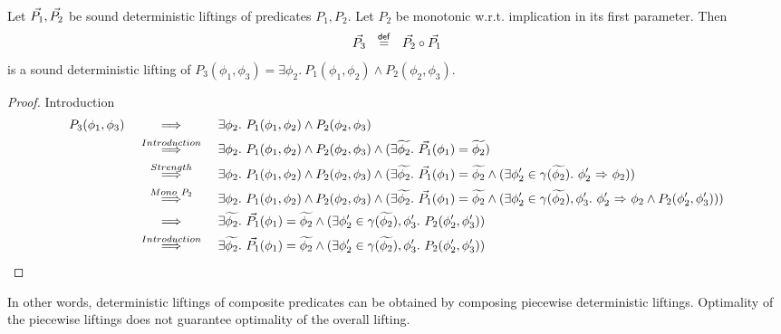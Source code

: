 \begin{lemma}~\\
    \label{lemma:det-lift-comp}
    Let $\vec{P_1}, \vec{P_2}$ be sound deterministic liftings of predicates $P_1, P_2$.
    Let $P_2$ be monotonic w.r.t. implication in its first parameter.
    Then
    \begin{displaymath}
    \vec{P_3} ~~\overset{\textup{\textmd{\textsf{def}}}}{=}~~ \vec{P_2} \circ \vec{P_1}
    \end{displaymath}
    is a sound deterministic lifting of $P_3(\phi_1, \phi_3) = \exists \phi_2.~ P_1(\phi_1, \phi_2) \wedge P_2(\phi_2, \phi_3)$.
\end{lemma}
\begin{proof}
    Introduction
    \begin{align*}
    P_3(\phi_1, \phi_3)
    & \overset{}{~\quad\quad\implies\quad\quad~} 
    \exists \phi_2.~ P_1(\phi_1, \phi_2) \wedge P_2(\phi_2, \phi_3)\\
    & \overset{Introduction}{~\quad\quad\implies\quad\quad~} 
    \exists \phi_2.~ P_1(\phi_1, \phi_2) \wedge P_2(\phi_2, \phi_3)
    \wedge (\exists \widetilde{\phi_2}.~ \vec{P_1}(\phi_1) = \widetilde{\phi_2})\\
    & \overset{Strength}{~\quad\quad\implies\quad\quad~} 
    \exists \phi_2.~ P_1(\phi_1, \phi_2) \wedge P_2(\phi_2, \phi_3)
    \wedge (\exists \widetilde{\phi_2}.~ \vec{P_1}(\phi_1) = \widetilde{\phi_2} \wedge 
           (\exists \phi_2' \in \gamma(\widetilde{\phi_2}).~ {\phi_2'} \,\,{\Rightarrow}\,\, {\phi_2}))\\
    & \overset{Mono~P_2}{~\quad\quad\implies\quad\quad~} 
           \exists \phi_2.~ P_1(\phi_1, \phi_2) \wedge P_2(\phi_2, \phi_3)
           \wedge (\exists \widetilde{\phi_2}.~ \vec{P_1}(\phi_1) = \widetilde{\phi_2} \wedge 
           (\exists \phi_2' \in \gamma(\widetilde{\phi_2}), \phi_3'.~ {\phi_2'} \,\,{\Rightarrow}\,\, {\phi_2} \wedge P_2(\phi_2', \phi_3')))\\
    & \overset{}{~\quad\quad\implies\quad\quad~} 
           \exists \widetilde{\phi_2}.~ \vec{P_1}(\phi_1) = \widetilde{\phi_2} \wedge 
           (\exists \phi_2' \in \gamma(\widetilde{\phi_2}), \phi_3'.~ P_2(\phi_2', \phi_3'))\\
    & \overset{Introduction}{~\quad\quad\implies\quad\quad~} 
           \exists \widetilde{\phi_2}.~ \vec{P_1}(\phi_1) = \widetilde{\phi_2} \wedge 
           (\exists \phi_2' \in \gamma(\widetilde{\phi_2}), \phi_3'.~ P_2(\phi_2', \phi_3'))\\
    \end{align*}
\end{proof}
In other words, deterministic liftings of composite predicates can be obtained by composing piecewise deterministic liftings.
Optimality of the piecewise liftings does not guarantee optimality of the overall lifting.

